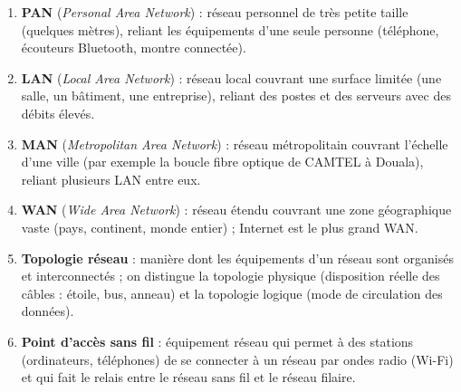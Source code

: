\documentclass[11pt]{article}
\newcommand{\cle}[1]{{\popxbold\color{popdark}#1}}
\begin{document}
\begin{corrige}
\begin{enumerate}
  \item \textbf{\cle{PAN}} (\emph{Personal Area Network}) : réseau personnel de très petite taille (quelques mètres), reliant les équipements d'une seule personne (téléphone, écouteurs Bluetooth, montre connectée).
  \item \textbf{\cle{LAN}} (\emph{Local Area Network}) : réseau local couvrant une surface limitée (une salle, un bâtiment, une entreprise), reliant des postes et des serveurs avec des débits élevés.
  \item \textbf{\cle{MAN}} (\emph{Metropolitan Area Network}) : réseau métropolitain couvrant l'échelle d'une ville (par exemple la boucle fibre optique de CAMTEL à Douala), reliant plusieurs LAN entre eux.
  \item \textbf{\cle{WAN}} (\emph{Wide Area Network}) : réseau étendu couvrant une zone géographique vaste (pays, continent, monde entier) ; Internet est le plus grand WAN.
  \item \textbf{\cle{Topologie réseau}} : manière dont les équipements d'un réseau sont organisés et interconnectés ; on distingue la \cle{topologie physique} (disposition réelle des câbles : étoile, bus, anneau) et la \cle{topologie logique} (mode de circulation des données).
  \item \textbf{\cle{Point d'accès sans fil}} : équipement réseau qui permet à des stations (ordinateurs, téléphones) de se connecter à un réseau par ondes radio (Wi-Fi) et qui fait le relais entre le réseau sans fil et le réseau filaire.
\end{enumerate}
\end{corrige}
\end{document}
